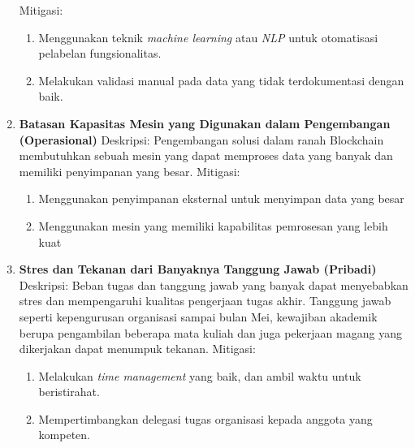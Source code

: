 \begin{enumerate}
	      Mitigasi:
	      \begin{enumerate}
		      \item Menggunakan teknik \textit{machine learning} atau \textit{NLP} untuk otomatisasi pelabelan fungsionalitas.
		      \item Melakukan validasi manual pada data yang tidak terdokumentasi dengan baik.
	      \end{enumerate}
	\item \textbf{Batasan Kapasitas Mesin yang Digunakan dalam Pengembangan (Operasional)} \newline
	      Deskripsi: Pengembangan solusi dalam ranah Blockchain membutuhkan sebuah mesin yang dapat memproses data yang banyak dan memiliki penyimpanan yang besar. \newline
	      Mitigasi:
	      \begin{enumerate}
		      \item Menggunakan penyimpanan eksternal untuk menyimpan data yang besar
		      \item Menggunakan mesin yang memiliki kapabilitas pemrosesan yang lebih kuat
	      \end{enumerate}
	\item \textbf{Stres dan Tekanan dari Banyaknya Tanggung Jawab (Pribadi)}  \newline
	      Deskripsi: Beban tugas dan tanggung jawab yang banyak dapat menyebabkan stres dan mempengaruhi kualitas pengerjaan tugas akhir. Tanggung jawab seperti kepengurusan organisasi sampai bulan Mei, kewajiban akademik berupa pengambilan beberapa mata kuliah dan juga pekerjaan magang yang dikerjakan dapat menumpuk tekanan. \newline
	      Mitigasi:
	      \begin{enumerate}
		      \item Melakukan \textit{time management} yang baik, dan ambil waktu untuk beristirahat.
		      \item Mempertimbangkan delegasi tugas organisasi kepada anggota yang kompeten.
	      \end{enumerate}
\end{enumerate}